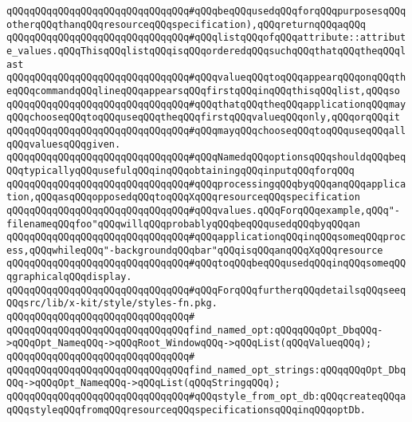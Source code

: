 \verb|qQQqqQQqqQQqqQQqqQQqqQQqqQQqqQQq#qQQqbeqQQqusedqQQqforqQQqpurposesqQQqotherqQQqthanqQQqresourceqQQqspecification),qQQqreturnqQQqaqQQq|\newline
\verb|qQQqqQQqqQQqqQQqqQQqqQQqqQQqqQQq#qQQqlistqQQqofqQQqattribute::attribute_values.qQQqThisqQQqlistqQQqisqQQqorderedqQQqsuchqQQqthatqQQqtheqQQqlast|\newline
\verb|qQQqqQQqqQQqqQQqqQQqqQQqqQQqqQQq#qQQqvalueqQQqtoqQQqappearqQQqonqQQqtheqQQqcommandqQQqlineqQQqappearsqQQqfirstqQQqinqQQqthisqQQqlist,qQQqso|\newline
\verb|qQQqqQQqqQQqqQQqqQQqqQQqqQQqqQQq#qQQqthatqQQqtheqQQqapplicationqQQqmayqQQqchooseqQQqtoqQQquseqQQqtheqQQqfirstqQQqvalueqQQqonly,qQQqorqQQqit|\newline
\verb|qQQqqQQqqQQqqQQqqQQqqQQqqQQqqQQq#qQQqmayqQQqchooseqQQqtoqQQquseqQQqallqQQqvaluesqQQqgiven.|\newline
\verb|qQQqqQQqqQQqqQQqqQQqqQQqqQQqqQQq#qQQqNamedqQQqoptionsqQQqshouldqQQqbeqQQqtypicallyqQQqusefulqQQqinqQQqobtainingqQQqinputqQQqforqQQq|\newline
\verb|qQQqqQQqqQQqqQQqqQQqqQQqqQQqqQQq#qQQqprocessingqQQqbyqQQqanqQQqapplication,qQQqasqQQqopposedqQQqtoqQQqXqQQqresourceqQQqspecification|\newline
\verb|qQQqqQQqqQQqqQQqqQQqqQQqqQQqqQQq#qQQqvalues.qQQqForqQQqexample,qQQq"-filenameqQQqfoo"qQQqwillqQQqprobablyqQQqbeqQQqusedqQQqbyqQQqan|\newline
\verb|qQQqqQQqqQQqqQQqqQQqqQQqqQQqqQQq#qQQqapplicationqQQqinqQQqsomeqQQqprocess,qQQqwhileqQQq"-backgroundqQQqbar"qQQqisqQQqanqQQqXqQQqresource|\newline
\verb|qQQqqQQqqQQqqQQqqQQqqQQqqQQqqQQq#qQQqtoqQQqbeqQQqusedqQQqinqQQqsomeqQQqgraphicalqQQqdisplay.|\newline
\verb|qQQqqQQqqQQqqQQqqQQqqQQqqQQqqQQq#qQQqForqQQqfurtherqQQqdetailsqQQqseeqQQqsrc/lib/x-kit/style/styles-fn.pkg.|\newline
\verb|qQQqqQQqqQQqqQQqqQQqqQQqqQQqqQQq#|\newline
\verb|qQQqqQQqqQQqqQQqqQQqqQQqqQQqqQQqfind_named_opt:qQQqqQQqOpt_DbqQQq->qQQqOpt_NameqQQq->qQQqRoot_WindowqQQq->qQQqList(qQQqValueqQQq);|\newline
\verb|qQQqqQQqqQQqqQQqqQQqqQQqqQQqqQQq#|\newline
\verb|qQQqqQQqqQQqqQQqqQQqqQQqqQQqqQQqfind_named_opt_strings:qQQqqQQqOpt_DbqQQq->qQQqOpt_NameqQQq->qQQqList(qQQqStringqQQq);|\newline
\newline
\verb|qQQqqQQqqQQqqQQqqQQqqQQqqQQqqQQq#qQQqstyle_from_opt_db:qQQqcreateqQQqaqQQqstyleqQQqfromqQQqresourceqQQqspecificationsqQQqinqQQqoptDb.|\newline
